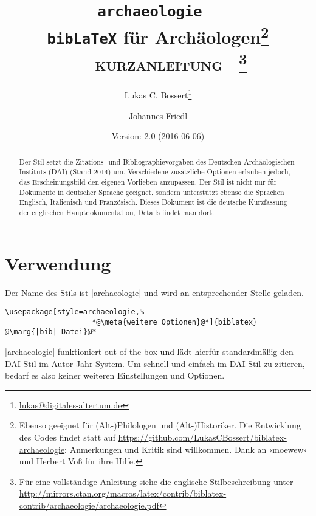 \documentclass[a4paper,10pt,ngerman]{ltxdoc}
\begin{document}
 \title{\texttt{archaeologie} -- \\\texttt{bib\LaTeX} für Archäologen\footnote{Ebenso geeignet für (Alt-)Philologen und (Alt-)Historiker.
 Die Entwicklung des Codes findet statt auf \url{https://github.com/LukasCBossert/biblatex-archaeologie}: 
 Anmerkungen und Kritik sind willkommen.
 Dank an   ›moewew‹ und Herbert Voß für ihre Hilfe.
}\\ --- {\scshape kurzanleitung} --\footnote{Für eine vollständige Anleitung siehe die englische Stilbeschreibung unter \url{http://mirrors.ctan.org/macros/latex/contrib/biblatex-contrib/archaeologie/archaeologie.pdf}} }
\author{Lukas C. Bossert\thanks{\url{lukas@digitales-altertum.de}} \and Johannes Friedl}
\date{Version: 2.0 (2016-06-06)}
 
 
 \maketitle
 \begin{abstract}
\noindent Der Stil setzt die Zitations- und Bibliographievorgaben des Deutschen Archäologischen Instituts (DAI) (Stand 2014) um. Verschiedene zusätzliche Optionen erlauben jedoch, das Erscheinungsbild den eigenen Vorlieben anzupassen. Der Stil ist nicht nur für Dokumente in deutscher Sprache geeignet, sondern unterstützt ebenso die Sprachen Englisch, Italienisch und Französisch. Dieses Dokument ist die deutsche Kurzfassung der englischen Hauptdokumentation, Details findet man dort.

 \end{abstract}

	{\parskip=0mm \tableofcontents}
\section{Verwendung}
   Der Name des Stils ist |archaeologie| und wird an entsprechender Stelle geladen.

\begin{lstlisting}
\usepackage[style=archaeologie,%
					*@\meta{weitere Optionen}@*]{biblatex}
@\marg{|bib|-Datei}@*
\end{lstlisting}

|archaeologie| funktioniert out-of-the-box und lädt hierfür standardmäßig den DAI-Stil im Autor-Jahr-System. 
Um schnell und einfach im DAI-Stil zu zitieren, bedarf es also keiner weiteren Einstellungen und Optionen. 
\end{document}
